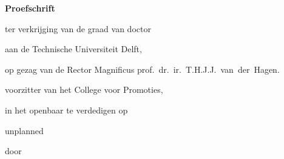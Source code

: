\begin{titlepage}

\begin{center}

\vspace*{2\bigskipamount}

{\makeatletter
\titlestyle\bfseries\LARGE\@title
\makeatother}

{\makeatletter
\ifx\@subtitle\undefined\else
    \bigskip
    \titlefont\titleshape\Large\@subtitle
\fi
\makeatother}

\end{center}

\cleardoublepage
\thispagestyle{empty}

\begin{center}


\vspace*{2\bigskipamount}

{\makeatletter
\titlestyle\bfseries\LARGE\@title
\makeatother}

{\makeatletter
\ifx\@subtitle\undefined\else
    \bigskip
    \titlefont\titleshape\Large\@subtitle
\fi
\makeatother}

\vfill


{\Large\titlefont\bfseries Proefschrift}

\bigskip
\bigskip

ter verkrijging van de graad van doctor

aan de Technische Universiteit Delft,

op gezag van de Rector Magnificus prof.~dr.~ir.~T.H.J.J.~van~der~Hagen.  %

voorzitter van het College voor Promoties,

in het openbaar te verdedigen op

unplanned

\bigskip
\bigskip

door

\bigskip
\bigskip


\end{center}
\end{titlepage}
